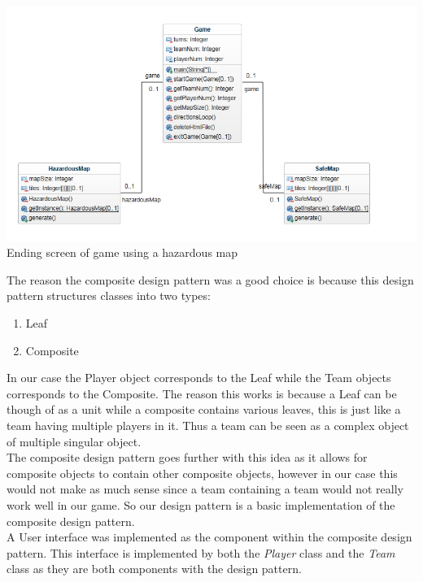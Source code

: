 \documentclass[a4paper,12pt]{extarticle}
\begin{document}
\begin{center}
\includegraphics[scale=0.5]{Enhancement2CD.png}\\
Ending screen of game using a hazardous map
\end{center}

\noindent The reason the composite design pattern was a good choice is because this design pattern structures classes into two types:\\

\begin{enumerate}
\item Leaf
\item Composite
\end{enumerate}

\noindent In our case the Player object corresponds to the Leaf while the Team objects  corresponds to the Composite. The reason this works is because a Leaf can be though of as a unit while a composite contains various leaves, this is just like a team having multiple players in it. Thus a team can be seen as a complex object of multiple singular object.\\

\noindent The composite design pattern goes further with this idea as it allows for composite objects to contain other composite objects, however in our case this would not make as much sense since a team containing a team would not really work well in our game. So our design pattern is a basic implementation of the composite design pattern.\\

\noindent A User interface was implemented as the component within the composite design pattern. This interface is implemented by both the \textit{Player} class and the \textit{Team} class as they are both components with the design pattern.\\
\end{document}
